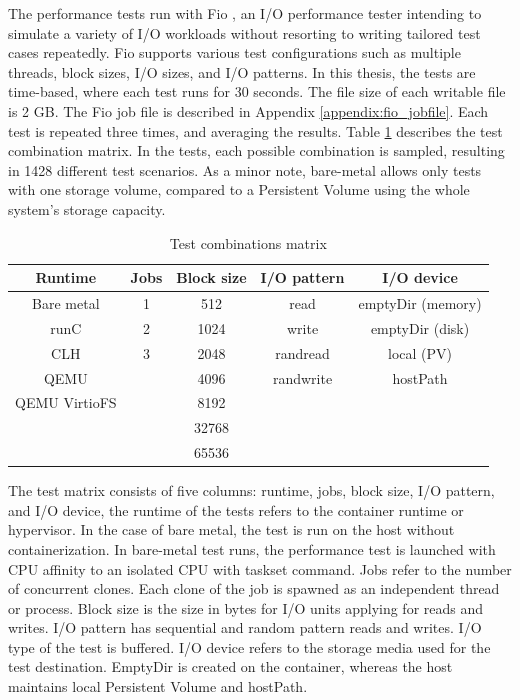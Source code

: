 The performance tests run with Fio \cite{FIO}, an I/O performance tester intending to simulate a variety of I/O workloads without resorting to writing tailored test cases repeatedly. Fio supports various test configurations such as multiple threads, block sizes, I/O sizes, and I/O patterns. In this thesis, the tests are time-based, where each test runs for 30 seconds. The file size of each writable file is 2 GB. The Fio job file is described in Appendix \ref{appendix:fio_jobfile}. Each test is repeated three times, and averaging the results. Table \ref{table:TestMatrix} describes the test combination matrix. In the tests, each possible combination is sampled, resulting in 1428 different test scenarios. As a minor note, bare-metal allows only tests with one storage volume, compared to a Persistent Volume using the whole system's storage capacity.

\begin{table}[ht]
\centering
\caption{Test combinations matrix}
\vspace{\baselineskip}
\begin{tabular}{| c | c | c | c | c |}
\hline
\textbf{Runtime} & \textbf{Jobs} & \textbf{Block size} & \textbf{I/O pattern} & \textbf{I/O device} \\ 
\hline
Bare metal & 1 & 512 & read & emptyDir (memory) \\
\hline
runC & 2 & 1024 & write & emptyDir (disk) \\ 
\hline
CLH & 3 & 2048 & randread & local (PV) \\
\hline
QEMU & & 4096 & randwrite & hostPath \\
\hline
QEMU VirtioFS & & 8192 & & \\
\hline
& & 32768 & & \\
\hline
& & 65536 & & \\
\hline
\end{tabular}
\label{table:TestMatrix}
\end{table}

The test matrix consists of five columns: runtime, jobs, block size, I/O pattern, and I/O device, the runtime of the tests refers to the container runtime or hypervisor. In the case of bare metal, the test is run on the host without containerization. In bare-metal test runs, the performance test is launched with CPU affinity to an isolated CPU with taskset \cite{taskset} command. Jobs refer to the number of concurrent clones. Each clone of the job is spawned as an independent thread or process. Block size is the size in bytes for I/O units applying for reads and writes. I/O pattern has sequential and random pattern reads and writes. I/O type of the test is buffered. I/O device refers to the storage media used for the test destination. EmptyDir is created on the container, whereas the host maintains local Persistent Volume and hostPath.

